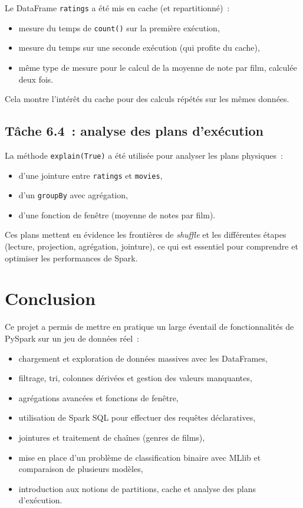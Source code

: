 \documentclass[a4paper,11pt]{article}
\begin{document}
Le DataFrame \texttt{ratings} a été mis en cache (et
repartitionné)~:
\begin{itemize}
  \item mesure du temps de \texttt{count()} sur la première exécution,
  \item mesure du temps sur une seconde exécution (qui profite du cache),
  \item même type de mesure pour le calcul de la moyenne de note
        par film, calculée deux fois.
\end{itemize}

Cela montre l'intérêt du cache pour des calculs répétés sur les
mêmes données.

\subsection{Tâche 6.4~: analyse des plans d'exécution}

La méthode \texttt{explain(True)} a été utilisée pour analyser
les plans physiques~:
\begin{itemize}
  \item d'une jointure entre \texttt{ratings} et \texttt{movies},
  \item d'un \texttt{groupBy} avec agrégation,
  \item d'une fonction de fenêtre (moyenne de notes par film).
\end{itemize}

Ces plans mettent en évidence les frontières de \emph{shuffle}
et les différentes étapes (lecture, projection, agrégation,
jointure), ce qui est essentiel pour comprendre et
optimiser les performances de Spark.

\section{Conclusion}

Ce projet a permis de mettre en pratique un large éventail de
fonctionnalités de PySpark sur un jeu de données réel~:
\begin{itemize}
  \item chargement et exploration de données massives avec les
        DataFrames,
  \item filtrage, tri, colonnes dérivées et gestion des valeurs
        manquantes,
  \item agrégations avancées et fonctions de fenêtre,
  \item utilisation de Spark SQL pour effectuer des requêtes
        déclaratives,
  \item jointures et traitement de chaînes (genres de films),
  \item mise en place d'un problème de classification binaire avec
        MLlib et comparaison de plusieurs modèles,
  \item introduction aux notions de partitions, cache et analyse
        des plans d'exécution.
\end{itemize}
\end{document}
